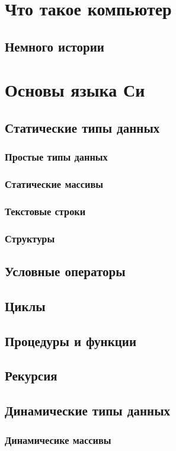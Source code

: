 \documentclass{bmstu}
\begin{document}
\tableofcontents




\chapter{Что такое компьютер}
\section{Немного истории}


\chapter{Основы языка Си}
\section{Статические типы данных}
\subsection{Простые типы данных}
\subsection{Статические массивы}
\subsection{Текстовые строки}
\subsection{Структуры}
\section{Условные операторы}
\section{Циклы}
\section{Процедуры и функции}
\section{Рекурсия}
\section{Динамические типы данных}
\subsection{Динамичесике массивы}
\end{document}
